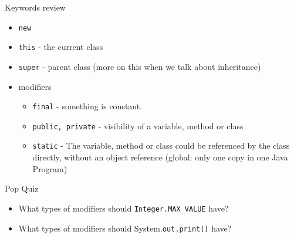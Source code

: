 \documentclass[aspectratio=169]{beamer}
\begin{document}
\begin{frame}[fragile]{Keywords review}
  \begin{itemize}
    \item \verb|new|
    \item \verb|this| - the current class
    \item \verb|super| - parent class (more on this when we talk about inheritance)
    \item modifiers
      \begin{itemize}
        \item \verb|final| - something is constant.
        \item \verb|public, private| - visibility of a variable, method or class
        \item \verb|static| - The variable, method or class could be referenced by the class directly, without an object reference
          (global: only one copy in one Java Program)
      \end{itemize}
  \end{itemize}
  \begin{alertblock}{Pop Quiz}
    \begin{itemize}
      \item What types of modifiers should \verb|Integer.MAX_VALUE| have?
      \item What types of modifiers should System.\verb|out.print()| have?
    \end{itemize}
  \end{alertblock}
\end{frame}
\end{document}
